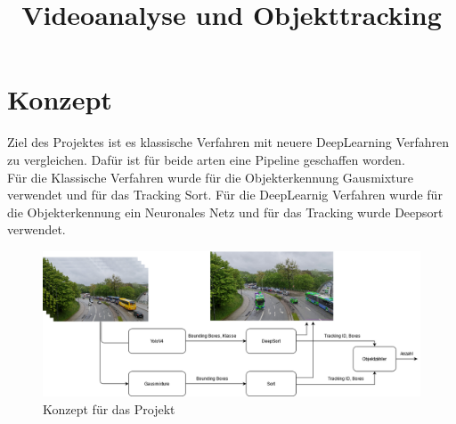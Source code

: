 \documentclass[conference]{IEEEtran}
\begin{document}
	
	\title{Videoanalyse und Objekttracking}
	
	\author{
	\and
	\and
	}

	
	\maketitle
	
	\begin{abstract}
		
	\end{abstract}
	
	\section{Konzept}
	Ziel des Projektes ist es klassische Verfahren mit neuere DeepLearning Verfahren zu vergleichen.
	Dafür ist für beide arten eine Pipeline geschaffen worden.\\
	Für die Klassische Verfahren wurde für die Objekterkennung Gausmixture verwendet und für das Tracking Sort. Für die DeepLearnig Verfahren wurde für die Objekterkennung ein Neuronales Netz  und für das Tracking wurde Deepsort verwendet.
	
	\begin{figure}[h]
		\begin{center}
			\includegraphics[width=14cm]{Media/KonzeptVAOT.png}
			\caption{Konzept für das Projekt}
			\label{Konzept}
		\end{center}
	\end{figure}
	
\end{document}
